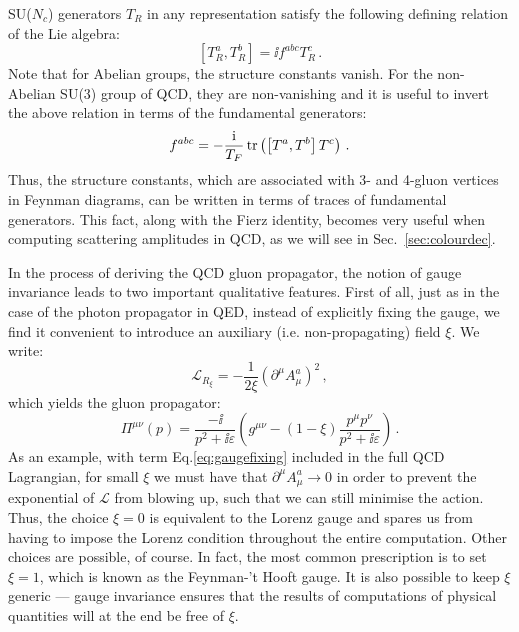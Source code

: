\documentclass[main.tex]{subfiles}
\begin{document}
SU($N_c$) generators $T_R$ in any representation satisfy the following defining relation of the Lie algebra:
\begin{equation} \label{eq:liealgebra}
    \left[T_R^a, T_R^b\right] = \ii f^{abc} T_R^c\,.
\end{equation}
Note that for Abelian groups, the structure constants vanish. For the non-Abelian SU(3) group of QCD, they are non-vanishing and it is useful to invert the above relation in terms of the fundamental generators:
\begin{equation} \label{eq:fabc}
    f^{abc} = -\frac{\mathrm{i}}{T_F} \operatorname{\rm tr} \left(\left[T^a, T^b \right] T^c \right)\,.
\end{equation}
Thus, the structure constants, which are associated with 3- and 4-gluon vertices in Feynman diagrams, can be written in terms of traces of fundamental generators. This fact, along with the Fierz identity, becomes very useful when computing scattering amplitudes in QCD, as we will see in Sec.~\ref{sec:colourdec}.

In the process of deriving the QCD gluon propagator, the notion of gauge invariance leads to two important qualitative features. First of all, just as in the case of the photon propagator in QED, instead of explicitly fixing the gauge, we find it convenient to introduce an auxiliary (i.e. non-propagating) field $\xi$. We write:
\begin{equation} \label{eq:gaugefixing}
    \mathcal{L}_{R_\xi} = -\frac{1}{2 \xi} \left(\partial^\mu A^a_\mu \right)^2\,,
\end{equation}
which yields the gluon propagator:
\begin{equation}
    \Pi^{\mu\nu}(p) = \frac{-\ii}{p^2+ \ii \varepsilon} \left(g^{\mu\nu} - (1-\xi) \frac{p^\mu p^\nu}{p^2+\ii \varepsilon} \right)\,.
\end{equation}
As an example, with term Eq.\ref{eq:gaugefixing} included in the full QCD Lagrangian, for small $\xi$ we must have that $\partial^\mu A^a_\mu \rightarrow 0$ in order to prevent the exponential of $\mathcal{L}$ from blowing up, such that we can still minimise the action. Thus, the choice $\xi = 0$ is equivalent to the Lorenz gauge and spares us from having to impose the Lorenz condition throughout the entire computation. Other choices are possible, of course. In fact, the most common prescription is to set $\xi = 1$, which is known as the Feynman-'t Hooft gauge. It is also possible to keep $\xi$ generic --- gauge invariance ensures that the results of computations of physical quantities will at the end be free of $\xi$.
\end{document}
